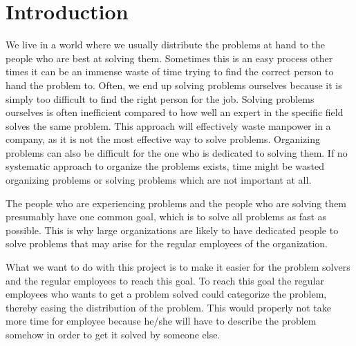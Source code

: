 \chapter{Introduction}
\label{sec:introduction}
\emptyTop{}%


We live in a world where we usually distribute the problems at hand to the people who are best at solving them.
Sometimes this is an easy process other times it can be an immense waste of time trying to find the correct person to hand the problem to.
Often, we end up solving problems ourselves because it is simply too difficult to find the right person for the job.
Solving problems ourselves is often inefficient compared to how well an expert in the specific field solves the same problem.
This approach will effectively waste manpower in a company, as it is not the most effective way to solve problems.
Organizing problems can also be difficult for the one who is dedicated to solving them.
If no systematic approach to organize the problems exists, time might be wasted organizing problems or solving problems which are not important at all.

The people who are experiencing problems and the people who are solving them presumably have one common goal, which is to solve all problems as fast as possible.
This is why large organizations are likely to have dedicated people to solve problems that may arise for the regular employees of the organization.

What we want to do with this project is to make it easier for the problem solvers and the regular employees to reach this goal.
To reach this goal the regular employees who wants to get a problem solved could categorize the problem, thereby easing the distribution of the problem.
This would properly not take more time for employee because he/she will have to describe the problem somehow in order to get it solved by someone else.

